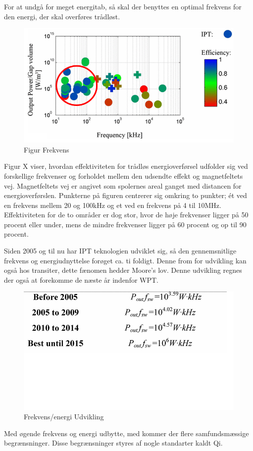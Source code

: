 For at undgå for meget energitab, så skal der benyttes en optimal frekvens for den energi, der skal overføres trådløst.

\begin{figure}[H]
\centering
\includegraphics[scale=0.5]{Vildledning/Schematics/Power_vs_frekvens.png}
\caption{Figur Frekvens}
\end{figure}

Figur X viser, hvordan effektiviteten for trådløs energioverførsel udfolder sig ved forskellige frekvenser og forholdet mellem den udsendte effekt og magnetfeltets vej. Magnetfeltets vej er angivet som spolernes areal ganget med distancen for energioverførslen. Punkterne på figuren centrerer sig omkring to punkter; ét ved en frekvens mellem 20 og 100kHz og et ved en frekvens på 4 til 10MHz. Effektiviteten for de to områder er dog stor, hvor de høje frekvenser ligger på 50 procent eller under, mens de mindre frekvenser ligger på 60 procent og op til 90 procent.

Siden 2005 og til nu har IPT teknologien udviklet sig, så den gennemsnitlige frekvens og energiudnyttelse forøget ca. ti foldigt. Denne from for udvikling kan også hos transiter, dette fænomen hedder Moore's lov. Denne udvikling regnes der også at forekomme de næste år indenfor WPT. 

\begin{figure}[H]
\centering
\includegraphics[scale=0.5]{Vildledning/Schematics/frekvens_energi}
\caption{Frekvens/energi Udvikling}
\end{figure}
Med øgende frekvens og energi udbytte, med kommer der flere samfundsmæssige begrænsninger. Disse begrænsninger styres af nogle standarter kaldt Qi. 

